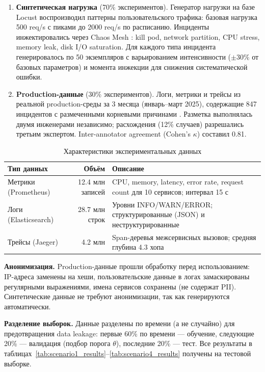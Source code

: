 \begin{enumerate}
    \item \textbf{Синтетическая нагрузка} (70\% экспериментов). Генератор нагрузки на базе Locust воспроизводил паттерны пользовательского трафика: базовая нагрузка 500 req/s с пиками до 2000 req/s по расписанию. Инциденты инжектировались через Chaos Mesh \cite{chaos_engineering}: kill pod, network partition, CPU stress, memory leak, disk I/O saturation. Для каждого типа инцидента генерировалось по 50 экземпляров с варьированием интенсивности ($\pm 30\%$ от базовых параметров) и момента инжекции для снижения систематической ошибки.

    \item \textbf{Production-данные} (30\% экспериментов). Логи, метрики и трейсы из реальной production-среды за 3 месяца (январь--март 2025), содержащие 847 инцидентов с размеченными корневыми причинами \cite{aiops_survey}. Разметка выполнялась двумя инженерами независимо; расхождения (12\% случаев) разрешались третьим экспертом. Inter-annotator agreement (Cohen's $\kappa$) составил 0.81.
\end{enumerate}

\begin{table}[H]
\centering
\small
\caption{Характеристики экспериментальных данных}
\label{tab:data_description}
\begin{tabular}{|l|r|p{5.5cm}|}
\hline
\textbf{Тип данных} & \textbf{Объём} & \textbf{Описание} \\
\hline
Метрики (Prometheus) & 12.4 млн записей & CPU, memory, latency, error rate, request count для 10 сервисов; интервал 15 с \\
\hline
Логи (Elasticsearch) & 28.7 млн строк & Уровни INFO/WARN/ERROR; структурированные (JSON) и неструктурированные \\
\hline
Трейсы (Jaeger) & 4.2 млн & Span-деревья межсервисных вызовов; средняя глубина 4.3 хопа \\
\hline
\end{tabular}
\end{table}

\textbf{Анонимизация.} Production-данные прошли обработку перед использованием: IP-адреса заменены на хеши, пользовательские данные в логах замаскированы регулярными выражениями, имена сервисов сохранены (не содержат PII). Синтетические данные не требуют анонимизации, так как генерируются автоматически.

\textbf{Разделение выборок.} Данные разделены по времени (а не случайно) для предотвращения data leakage: первые 60\% по времени --- обучение, следующие 20\% --- валидация (подбор порога $\theta$), последние 20\% --- тест. Все результаты в таблицах~\ref{tab:scenario1_results}--\ref{tab:scenario4_results} получены на тестовой выборке.

